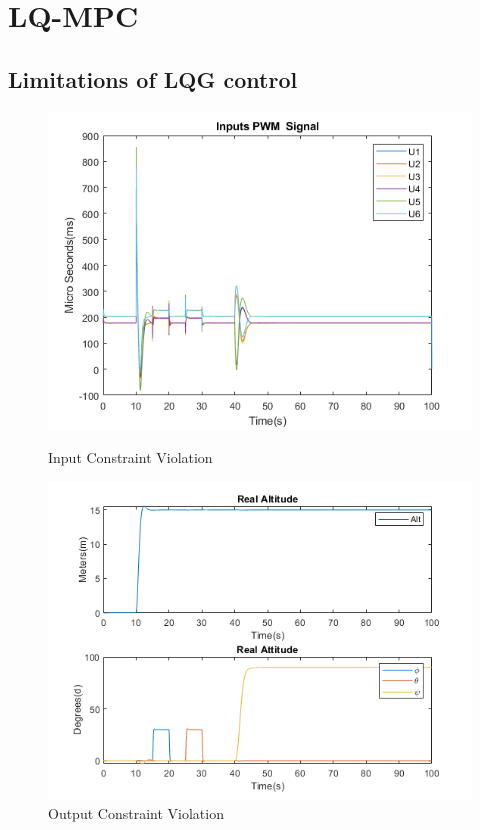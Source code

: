 \documentclass[12pt,a4paper,twoside]{report}
\begin{document}
		\newpage
		
		\section{LQ-MPC}
			
			\subsection{Limitations of LQG control}
				
				\begin{figure}[h!]
					\centering
					\begin{minipage}{0.5\textwidth}
						\centering
						\includegraphics[width=1\textwidth]{LQGInputConstraintViolation.png}
						\caption{Input Constraint Violation}
						\label{fig:inputconstraintviolation}
					\end{minipage}\hfill
					\begin{minipage}{0.5\textwidth}
						\centering
						\includegraphics[width=1\textwidth]{LQGOutputConstraintViolation.png}
						\caption{Output Constraint Violation}
						\label{fig:outputconstraintviolation}
					\end{minipage}
				\end{figure}
				
\end{document}
